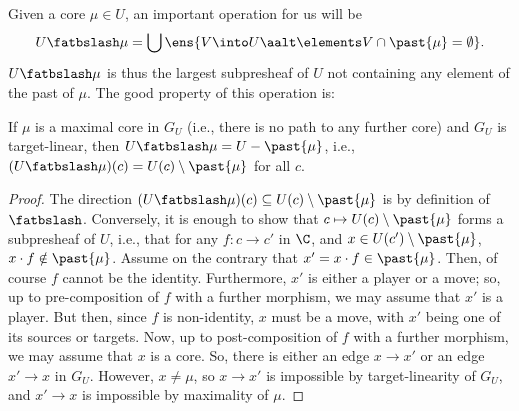\documentclass{LMCS}
\theoremstyle{plain}\newtheorem{satz}[thm]{Satz}
\begin{document}
Given a core $\mu \in U$, an important operation for us will be $$U
\fatbslash \mu = \bigcup \ens{V \into U \aalt \elements V \cap \past{\mu} =
  \emptyset}.$$ $U \fatbslash \mu$ is thus the largest subpresheaf of
$U$ not containing any element of the past of $\mu$. The good property
of this operation is:
\begin{prop}\label{prop:maxcore}
  If $\mu$ is a maximal core in $G_U$ (i.e., there is no path to any
  further core) and $G_U$ is target-linear, then $U \fatbslash \mu =
  U - \past{\mu}$, i.e., $(U \fatbslash \mu) (c) = U (c) \setminus
  \past{\mu}$ for all $c$.
\end{prop}
\begin{proof}
  The direction $(U \fatbslash \mu) (c) \subseteq U (c) \setminus
  \past{\mu}$ is by definition of $\fatbslash$. Conversely, it is
  enough to show that $c \mapsto U(c) \setminus \past{\mu}$ forms a
  subpresheaf of $U$, i.e., that for any $f \colon c \to c'$ in $\C$,
  and $x \in U(c') \setminus \past{\mu}$, $x \cdot f \notin
  \past{\mu}$. Assume on the contrary that $x' = x \cdot f \in
  \past{\mu}$. Then, of course $f$ cannot be the
  identity. Furthermore, $x'$ is either a player or a move; so, up to
  pre-composition of $f$ with a further morphism, we may assume that
  $x'$ is a player.  But then, since $f$ is non-identity, $x$ must be
  a move, with $x'$ being one of its sources or targets.  Now, up to
  post-composition of $f$ with a further morphism, we may assume that
  $x$ is a core.  So, there is either an edge $x \to x'$ or an edge
  $x' \to x$ in $G_U$. However, $x \neq \mu$, so $x \to x'$ is
  impossible by target-linearity of $G_U$, and $x' \to x$ is
  impossible by maximality of $\mu$.
\end{proof}
\end{document}
